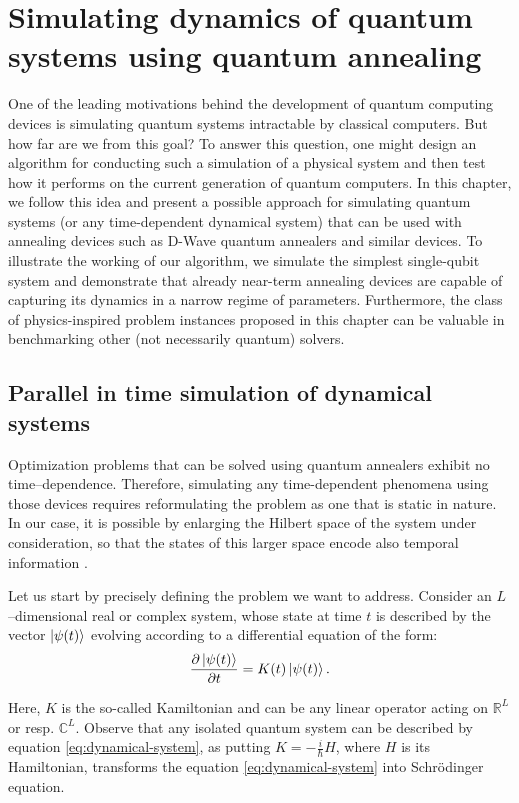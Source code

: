 \chapter{Simulating dynamics of quantum systems using quantum annealing}
\label{chapter:simulating}

One of the leading motivations behind the development of quantum computing
devices is simulating quantum systems intractable by classical computers. But
how far are we from this goal? To answer this question, one might design an
algorithm for conducting such a simulation of a physical system and then test
how it performs on the current generation of quantum computers. In this
chapter, we follow this idea and present a possible approach for simulating
quantum systems (or any time-dependent dynamical system) that can be used with
annealing devices such as D-Wave quantum annealers and similar devices. To
illustrate the working of our algorithm, we simulate the simplest single-qubit
system and demonstrate that already near-term annealing devices are capable of
capturing its dynamics in a narrow regime of parameters. Furthermore, the class
of physics-inspired problem instances proposed in this chapter
can be valuable in benchmarking other (not necessarily quantum) solvers.

\section{Parallel in time simulation of dynamical systems}
Optimization problems that can be solved using quantum annealers exhibit no
time--dependence. Therefore, simulating any time-dependent phenomena using
those devices requires reformulating the problem as one that is static in
nature. In our case, it is possible by enlarging the Hilbert space of the
system under consideration, so that the states of this larger space encode also
temporal information \cite{feynmanclock}.

Let us start by precisely defining the problem we want to address.
Consider an $L$--dimensional real or complex system, whose state at time $t$ is
described by the vector $\ket{\psi(t)}$ evolving according to a differential
equation of the form:
\begin{equation}
  \label{eq:dynamical-system}
  \frac{\partial \ket{\psi(t)}}{\partial t} = K(t) \ket{\psi(t)}.
\end{equation}

Here, $K$ is the so-called Kamiltonian \cite{goldstein2002classical} and can be
any linear operator acting on $\mathbb{R}^L$ or resp. $\mathbb{C}^L$. Observe
that any isolated quantum system can be described by equation
\eqref{eq:dynamical-system}, as putting $K=-\frac{i}{\hbar}H$, where $H$ is its
Hamiltonian, transforms the equation \eqref{eq:dynamical-system} into
Schr\"{o}dinger equation.

